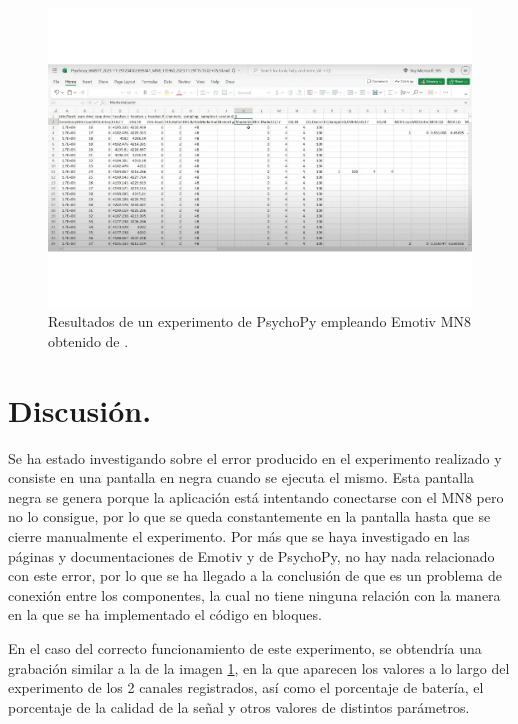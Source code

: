 \begin{figure}[H]
    \centering
    \includegraphics[width=1.2\textwidth]{img/ResultadosExperimentoYoutube.pdf}
    \caption{Resultados de un experimento de PsychoPy empleando Emotiv MN8 obtenido de \cite{VideoExperimentoMN8PsychoPy}.}
    \label{fig: ResultadosExperimentoYoutube}
    \end{figure}

\section{Discusión.}

Se ha estado investigando sobre el error producido en el experimento realizado y consiste en una pantalla en negra cuando se ejecuta el mismo. Esta pantalla negra se genera porque la aplicación está intentando conectarse con el MN8 pero no lo consigue, por lo que se queda constantemente en la pantalla hasta que se cierre manualmente el experimento. Por más que se haya investigado en las páginas y documentaciones de Emotiv y de PsychoPy, no hay nada relacionado con este error, por lo que se ha llegado a la conclusión de que es un problema de conexión entre los componentes, la cual no tiene ninguna relación con la manera en la que se ha implementado el código en bloques.

En el caso del correcto funcionamiento de este experimento, se obtendría una grabación similar a la de la imagen \ref{fig: ResultadosExperimentoYoutube}, en la que aparecen los valores a lo largo del experimento de los 2 canales registrados, así como el porcentaje de batería, el porcentaje de la calidad de la señal y otros valores de distintos parámetros.

